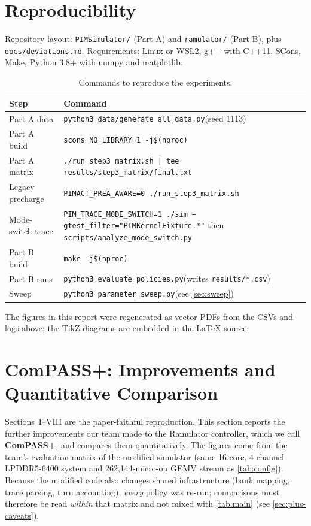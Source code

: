 \documentclass[conference]{IEEEtran}
\newcommand{\cmd}[1]{\texttt{\footnotesize #1}}
\begin{document}
\section{Reproducibility}\label{sec:repro}
Repository layout: \cmd{PIMSimulator/} (Part A) and \cmd{ramulator/} (Part B), plus \cmd{docs/deviations.md}. Requirements: Linux or WSL2, g++ with C++11, SCons, Make, Python 3.8+ with numpy and matplotlib.
\begin{table}[!t]
\centering
\caption{Commands to reproduce the experiments.}\label{tab:repro}
\footnotesize
\begin{tabular}{@{}p{3.1cm}p{12cm}@{}}
\toprule
\textbf{Step} & \textbf{Command}\\
\midrule
Part A data & \cmd{python3 data/generate\_all\_data.py}\hfill(seed 1113)\\
Part A build & \cmd{scons NO\_LIBRARY=1 -j\$(nproc)}\\
Part A matrix & \cmd{./run\_step3\_matrix.sh | tee results/step3\_matrix/final.txt}\\
Legacy precharge & \cmd{PIMACT\_PREA\_AWARE=0 ./run\_step3\_matrix.sh}\\
Mode-switch trace & \cmd{PIM\_TRACE\_MODE\_SWITCH=1 ./sim --gtest\_filter="PIMKernelFixture.*"} then \cmd{scripts/analyze\_mode\_switch.py}\\
Part B build & \cmd{make -j\$(nproc)}\\
Part B runs & \cmd{python3 evaluate\_policies.py}\hfill(writes \cmd{results/*.csv})\\
Sweep & \cmd{python3 parameter\_sweep.py}\hfill(see \cref{sec:sweep})\\
\bottomrule
\end{tabular}
\end{table}
The figures in this report were regenerated as vector PDFs from the CSVs and logs above; the TikZ diagrams are embedded in the \LaTeX{} source.


\section{ComPASS+: Improvements and Quantitative Comparison}\label{sec:plus}
Sections~I--VIII are the paper-faithful reproduction. This section reports the further improvements our team made to the Ramulator controller, which we call \textbf{ComPASS+}, and compares them quantitatively. The figures come from the team's evaluation matrix of the modified simulator (same 16-core, 4-channel LPDDR5-6400 system and 262{,}144-micro-op GEMV stream as \cref{tab:config}). Because the modified code also changes shared infrastructure (bank mapping, trace parsing, turn accounting), \emph{every} policy was re-run; comparisons must therefore be read \emph{within} that matrix and not mixed with \cref{tab:main} (see \cref{sec:plus-caveats}).
\end{document}

